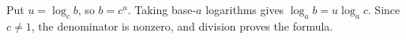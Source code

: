 Put $u=\log_cb$, so $b=c^u$. Taking base-$a$ logarithms gives $\log_ab=u\log_ac$. Since $c\ne1$, the denominator is nonzero, and division proves the formula.
